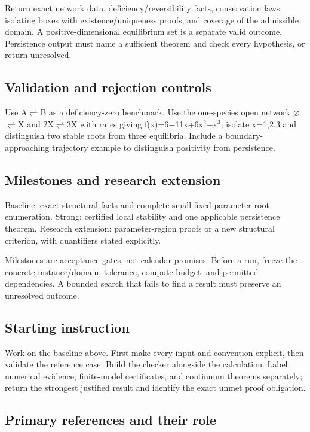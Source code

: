 \documentclass[
  11pt,
]{article}
\begin{document}
Return exact network data, deficiency/reversibility facts, conservation
laws, isolating boxes with existence/uniqueness proofs, and coverage of
the admissible domain. A positive-dimensional equilibrium set is a
separate valid outcome. Persistence output must name a sufficient
theorem and check every hypothesis, or return unresolved.

\subsection{Validation and rejection controls}

Use A\ensuremath{\rightleftharpoons}B as a deficiency-zero benchmark.
Use the one-species open network
\ensuremath{\varnothing}\ensuremath{\rightleftharpoons}X and
2X\ensuremath{\rightleftharpoons}3X with rates giving
f(x)=6\ensuremath{-}11x+6x\ensuremath{{}^{2}}\ensuremath{-}x\ensuremath{{}^{3}};
isolate x=1,2,3 and distinguish two stable roots from three equilibria.
Include a boundary-approaching trajectory example to distinguish
positivity from persistence.

\subsection{Milestones and research extension}

Baseline: exact structural facts and complete small fixed-parameter root
enumeration. Strong: certified local stability and one applicable
persistence theorem. Research extension: parameter-region proofs or a
new structural criterion, with quantifiers stated explicitly.

Milestones are acceptance gates, not calendar promises. Before a run,
freeze the concrete instance/domain, tolerance, compute budget, and
permitted dependencies. A bounded search that fails to find a result
must preserve an unresolved outcome.

\subsection{Starting instruction}

Work on the baseline above. First make every input and convention
explicit, then validate the reference case. Build the checker alongside
the calculation. Label numerical evidence, finite-model certificates,
and continuum theorems separately; return the strongest justified result
and identify the exact unmet proof obligation.

\subsection{Primary references and their role}
\end{document}
